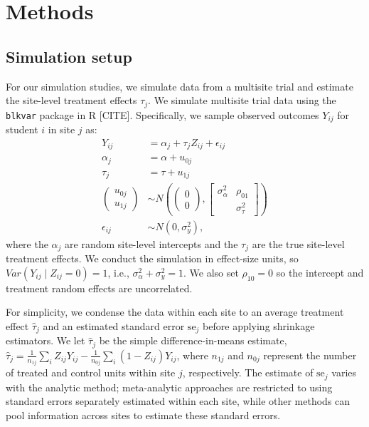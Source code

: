 \documentclass[]{article}
\begin{document}

\section{Methods}

\subsection{Simulation setup}

For our simulation studies, we simulate data from a multisite trial and estimate the site-level treatment effects $\tau_j$.
We simulate multisite trial data using the \texttt{blkvar} package in R [CITE].
Specifically, we sample observed outcomes $Y_{ij}$ for student $i$ in site $j$ as:
\begin{align*}
	Y_{ij} &= \alpha_j + \tau_j Z_{ij} + \epsilon_{ij} \\
	\alpha_j &= \alpha + u_{0j} \\
	\tau_j &= \tau + u_{1j} \\
	\begin{pmatrix}
		u_{0j} \\ u_{1j}
	\end{pmatrix} &\sim N\left(
	\begin{pmatrix}
		0 \\ 0
	\end{pmatrix}, 
	\begin{bmatrix}
		\sigma^2_\alpha & \rho_{01} \\  & \sigma^2_\tau
	\end{bmatrix}\right) \\
	\epsilon_{ij} &\sim N(0, \sigma^2_y) ,
\end{align*}
where the $\alpha_j$ are random site-level intercepts and the $\tau_j$ are the true site-level treatment effects.
We conduct the simulation in effect-size units, so $Var(Y_{ij} \mid Z_{ij}=0)=1$, i.e., $\sigma^2_\alpha + \sigma^2_y = 1$.
We also set $\rho_{10}=0$ so the intercept and treatment random effects are uncorrelated.

For simplicity, we condense the data within each site to an average treatment effect $\hat{\tau}_j$ and an estimated standard error $\text{se}_j$ before applying shrinkage estimators.
We let $\hat{\tau}_j$ be the simple difference-in-means estimate, $\hat{\tau}_j = \frac{1}{n_{1j}} \sum_i Z_{ij}Y_{ij} - \frac{1}{n_{0j}} \sum_i (1-Z_{ij})Y_{ij}$, where $n_{1j}$ and $n_{0j}$ represent the number of treated and control units within site $j$, respectively.
The estimate of $\text{se}_j$ varies with the analytic method; meta-analytic approaches are restricted to using standard errors separately estimated within each site, while other methods can pool information across sites to estimate these standard errors.
\end{document}
